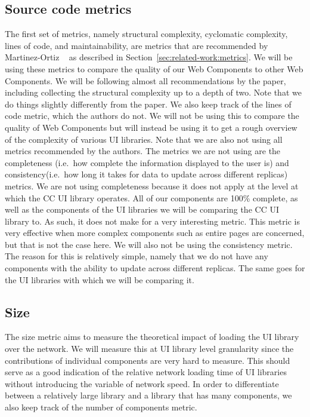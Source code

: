 \subsection{Source code metrics}
The first set of metrics, namely structural complexity, cyclomatic complexity, lines of code, and maintainability, are metrics that are recommended by Martinez-Ortiz \etal{}~\cite{martinez-ortiz2016quality} as described in Section~\ref{sec:related-work:metrics}. We will be using these metrics to compare the quality of our Web Components to other Web Components. We will be following almost all recommendations by the paper, including collecting the structural complexity up to a depth of two. Note that we do things slightly differently from the paper. We also keep track of the lines of code metric, which the authors do not. We will not be using this to compare the quality of Web Components but will instead be using it to get a rough overview of the complexity of various UI libraries. Note that we are also not using all metrics recommended by the authors. The metrics we are not using are the completeness (i.e.~how complete the information displayed to the user is) and consistency(i.e.~how long it takes for data to update across different replicas) metrics. We are not using completeness because it does not apply at the level at which the CC UI library operates. All of our components are 100\% complete, as well as the components of the UI libraries we will be comparing the CC UI library to. As such, it does not make for a very interesting metric. This metric is very effective when more complex components such as entire pages are concerned, but that is not the case here. We will also not be using the consistency metric. The reason for this is relatively simple, namely that we do not have any components with the ability to update across different replicas. The same goes for the UI libraries with which we will be comparing it.

\subsection{Size}
The size metric aims to measure the theoretical impact of loading the UI library over the network. We will measure this at UI library level granularity since the contributions of individual components are very hard to measure. This should serve as a good indication of the relative network loading time of UI libraries without introducing the variable of network speed. In order to differentiate between a relatively large library and a library that has many components, we also keep track of the number of components metric.


